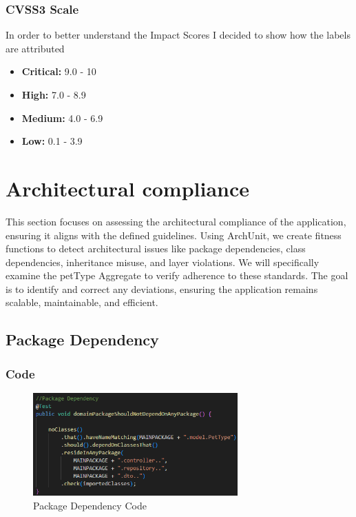 \documentclass[a4paper,11pt,openright,BCOR=15mm]{scrbook}
\begin{document}
\subsection{CVSS3 Scale}
In order to better understand the Impact Scores I decided to show how the labels are attributed
\begin{itemize}
	\item \textbf{Critical:} 9.0 - 10
	\item \textbf{High:} 7.0 - 8.9
	\item \textbf{Medium:} 4.0 - 6.9
	\item \textbf{Low:} 0.1 - 3.9
\end{itemize}
	\chapter{Architectural compliance}
	This section focuses on assessing the architectural compliance of the application, ensuring it aligns with the defined guidelines. Using ArchUnit, we create fitness functions to detect architectural issues like package dependencies, class dependencies, inheritance misuse, and layer violations. We will specifically examine the petType Aggregate to verify adherence to these standards. The goal is to identify and correct any deviations, ensuring the application remains scalable, maintainable, and efficient.

	\section{Package Dependency}
	\subsection{Code}
	\begin{figure}[H]
		\centering
		\includegraphics[width=0.7\textwidth]{figs/Architectural Compliance/Package Dependency Code.png}
		\caption{Package Dependency Code}
		\label{fig:Class-Dependency-Code}
	\end{figure}
\end{document}
